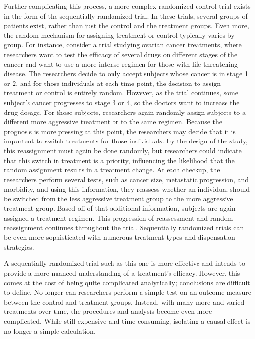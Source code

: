Further complicating this process, a more complex randomized control trial exists in the form of the sequentially randomized trial.  In these trials, several groups of patients exist, rather than just the control and the treatment groups.  Even more, the random mechanism for assigning treatment or control typically varies by group.  For instance, consider a trial studying ovarian cancer treatments, where researchers want to test the efficacy of several drugs on different stages of the cancer and want to use a more intense regimen for those with life threatening disease.  The researchers decide to only accept subjects whose cancer is in stage 1 or 2, and for those individuals at each time point, the decision to assign treatment or control is entirely random.  However, as the trial continues, some subject's cancer progresses to stage 3 or 4, so the doctors want to increase the drug dosage.  For those subjects, researchers again randomly assign subjects to a different more aggressive treatment or to the same regimen.  Because the prognosis is more pressing at this point, the researchers may decide that it is important to switch treatments for those individuals.  By the design of the study, this reassignment must again be done randomly, but researchers could indicate that this switch in treatment is a priority, influencing the likelihood that the random assignment results in a treatment change.  At each checkup, the researchers perform several tests, such as cancer size, metastatic progression, and morbidity, and using this information, they reassess whether an individual should be switched from the less aggressive treatment group to the more aggressive treatment group. Based off of that additional information, subjects are again assigned a treatment regimen.  This progression of reassessment and random reassignment continues throughout the trial.  Sequentially randomized trials can be even more sophisticated with numerous treatment types and dispensation strategies.\cite{doi:10.1093/jnci/djm185}  

A sequentially randomized trial such as this one is more effective and intends to provide a more nuanced understanding of a treatment's efficacy.  However, this comes at the cost of being quite complicated analytically; conclusions are difficult to define.  No longer can researchers perform a simple test on an outcome measure between the control and treatment groups.  Instead, with many more and varied treatments over time, the procedures and analysis become even more complicated.  While still expensive and time consuming, isolating a causal effect is no longer a simple calculation.  
 
